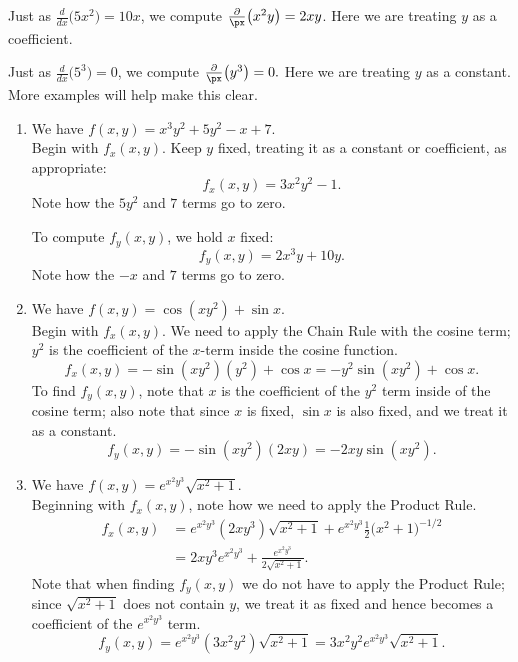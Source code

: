 Just as $\frac{d}{dx}\big(5x^2\big) = 10x$, we compute $\frac{\partial}{\px}\big(x^2y\big) = 2xy$. Here we are treating $y$ as a coefficient.

Just as $\frac{d}{dx}\big(5^3\big) = 0$, we compute $\frac{\partial}{\px}\big(y^3\big) = 0.$ Here we are treating $y$ as a constant. More examples will help make this clear.\\

{\begin{enumerate}
	\item We have $f(x,y) = x^3y^2+ 5y^2-x+7$.\\
	Begin with $f_x(x,y)$. Keep $y$ fixed, treating it as a constant or coefficient, as appropriate:
	$$f_x(x,y) = 3x^2y^2-1.$$ Note how the $5y^2$ and $7$ terms go to zero.
	
	To compute $f_y(x,y)$, we hold $x$ fixed:
	$$f_y(x,y) = 2x^3y+10y.$$ Note how the $-x$ and $7$ terms go to zero.
	
	\item We have $f(x,y) = \cos(xy^2)+\sin x$.\\
	Begin with $f_x(x,y)$. We need to apply the Chain Rule with the cosine term; $y^2$ is the coefficient of the $x$-term inside the cosine function.
	$$f_x(x,y) = -\sin(xy^2)(y^2)+\cos x = -y^2\sin(xy^2)+\cos x.$$
	To find $f_y(x,y)$, note that $x$ is the coefficient of the $y^2$ term inside of the cosine term; also note that since $x$ is fixed, $\sin x$ is also fixed, and we treat it as a constant.
	$$f_y(x,y) = -\sin(xy^2)(2xy) = -2xy\sin(xy^2).$$
	
	\item		We have $f(x,y) = e^{x^2y^3}\sqrt{x^2+1}$.\\
	Beginning with $f_x(x,y)$, note how we need to apply the Product Rule. 
	\begin{align*}
	f_x(x,y) &= e^{x^2y^3}(2xy^3)\sqrt{x^2+1} + e^{x^2y^3}\frac12\big(x^2+1\big)^{-1/2} \\
					&= 2xy^3e^{x^2y^3}+\frac{e^{x^2y^3}}{2\sqrt{x^2+1}}.
	\end{align*}
	Note that when finding $f_y(x,y)$ we do not have to apply the Product Rule; since $\sqrt{x^2+1}$ does not contain $y$, we treat it as fixed and hence becomes a coefficient of the $e^{x^2y^3}$ term.
	$$f_y(x,y) = e^{x^2y^3}(3x^2y^2)\sqrt{x^2+1} = 3x^2y^2e^{x^2y^3}\sqrt{x^2+1}.$$
\end{enumerate}
\baselineskip
}\\

